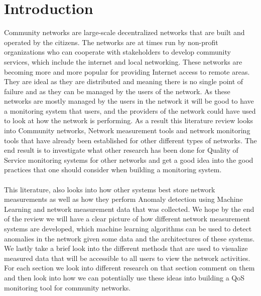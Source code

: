 \section{Introduction}\label{sec:introduction}
Community networks are large-scale decentralized networks that are built and operated by the citizens\cite{Selimi:2014:TAD:2723218.2723265}.
The networks are at times run by non-profit organizations who can cooperate with stakeholders to develop community services, which include the internet and local networking\cite{Braem:2013:CRC:2500098.2500108}.
These networks are becoming more and more popular for providing Internet access to remote areas.
They are ideal as they are distributed and meaning there is no single point of failure and  as they can be managed by the users of the network.
As these networks are mostly managed by the users in the network it will be good to have a monitoring system that users, and the providers of the network could have used to look at how the network is performing.
As a result this literature review looks into Community networks, Network measurement tools and network monitoring tools that have already been established for other different types of networks.
The end result is to investigate what other research has been done for Quality of Service monitoring systems for other networks and get a good idea into the good practices that one should consider when building a monitoring system.
\paragraph{}
This literature, also looks into how other systems best store network measurements as well as how they perform Anomaly detection using Machine Learning and network measurement data that was collected.
We hope by the end of the review we will have a clear picture of how different network measurement systems are developed, which machine learning algorithms can be used to detect anomalies in the network given some data and the architectures of these systems.
We lastly take a brief look into the different methods that are used to visualize measured data that will be accessible to all users to view the network activities.
For each section we look into different research on that section comment on them and then look into how we can potentially use these ideas into building a QoS monitoring tool for community networks.
